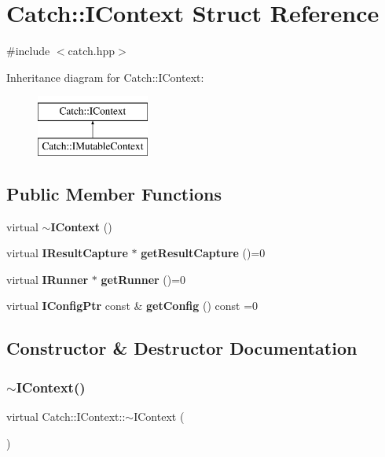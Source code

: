 \section{Catch\+::I\+Context Struct Reference}
\label{struct_catch_1_1_i_context}


{\ttfamily \#include $<$catch.\+hpp$>$}

Inheritance diagram for Catch\+::I\+Context\+:\begin{figure}[H]
\begin{center}
\leavevmode
\includegraphics[height=2.000000cm]{struct_catch_1_1_i_context}
\end{center}
\end{figure}
\subsection*{Public Member Functions}
\begin{DoxyCompactItemize}
\item 
virtual \textbf{ $\sim$\+I\+Context} ()
\item 
virtual \textbf{ I\+Result\+Capture} $\ast$ \textbf{ get\+Result\+Capture} ()=0
\item 
virtual \textbf{ I\+Runner} $\ast$ \textbf{ get\+Runner} ()=0
\item 
virtual \textbf{ I\+Config\+Ptr} const  \& \textbf{ get\+Config} () const =0
\end{DoxyCompactItemize}


\subsection{Constructor \& Destructor Documentation}
\mbox{\label{struct_catch_1_1_i_context_aeb17355c1be6c2ced5407cad7202628d}} 
\subsubsection{$\sim$IContext()}
{\footnotesize\ttfamily virtual Catch\+::\+I\+Context\+::$\sim$\+I\+Context (\begin{DoxyParamCaption}{ }\end{DoxyParamCaption})\hspace{0.3cm}{\ttfamily [virtual]}}



